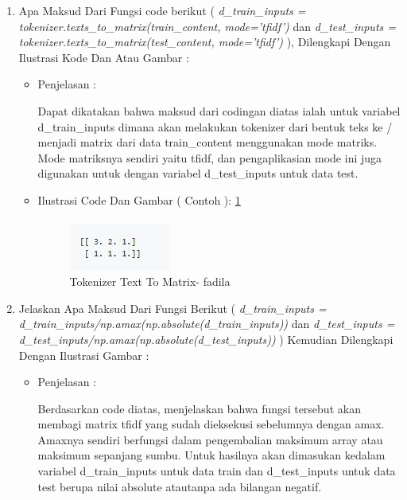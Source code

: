 \begin{enumerate}
\item Apa Maksud Dari Fungsi code berikut ( \emph{d\_train\_inputs = tokenizer.texts\_to\_matrix(train\_content, mode='tfidf')} dan \emph{d\_test\_inputs = tokenizer.texts\_to\_matrix(test\_content, mode='tfidf')} ), Dilengkapi Dengan Ilustrasi Kode Dan Atau Gambar :
\begin{itemize}
\item Penjelasan	:
\par Dapat dikatakan bahwa maksud dari codingan diatas ialah untuk variabel d\_train\_inputs dimana akan melakukan tokenizer dari bentuk teks ke / menjadi matrix dari data train\_content menggunakan mode matriks. Mode matriksnya sendiri yaitu tfidf, dan pengaplikasian mode ini juga digunakan untuk dengan variabel d\_test\_inputs untuk data test.
\par
\par
\item Ilustrasi Code Dan Gambar	( Contoh ): \ref{chapter-7-tokenizer-text-matrix-fadila}

\par
\par
\begin{figure}[!hbtp]
\centering
\includegraphics[scale=0.7]{figures/chapter-7-tokenizer-text-matrix-fadila.jpg}
\caption{Tokenizer Text To Matrix- fadila}
\label{chapter-7-tokenizer-text-matrix-fadila}
\end{figure}
\par
\par
\end{itemize}
\par
\par
\par
\item Jelaskan Apa Maksud Dari Fungsi Berikut ( \emph{d\_train\_inputs = d\_train\_inputs/np.amax(np.absolute(d\_train\_inputs))} dan \emph{d\_test\_inputs = d\_test\_inputs/np.amax(np.absolute(d\_test\_inputs))} ) Kemudian Dilengkapi Dengan Ilustrasi Gambar :
\begin{itemize}
\item Penjelasan : 
\par Berdasarkan code diatas, menjelaskan bahwa fungsi tersebut akan membagi matrix tfidf yang sudah dieksekusi sebelumnya dengan amax. Amaxnya sendiri berfungsi dalam pengembalian maksimum array atau maksimum sepanjang sumbu. Untuk hasilnya akan dimasukan kedalam variabel d\_train\_inputs untuk data train dan d\_test\_inputs untuk data test berupa nilai absolute atautanpa ada bilangan negatif.

\end{itemize}
\end{enumerate}
